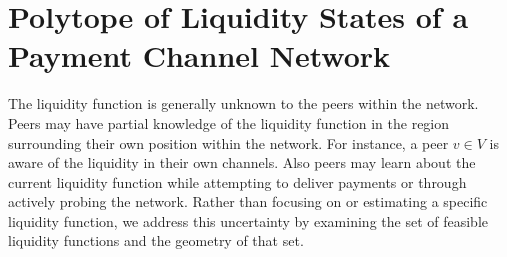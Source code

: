 \documentclass[10pt,twocolumn]{article}
\newtheorem{definition}{Definition}[section]
\newtheorem{lemma}[theorem]{Lemma}
\newcommand{\longhookrightarrow}{\lhook\joinrel\longrightarrow}
\begin{document}
\section{Polytope of Liquidity States of a Payment Channel Network}
\label{sec:statePolytope}

The liquidity function is generally unknown to the peers within the network.
Peers may have partial knowledge of the liquidity function in the region surrounding their own position within the network.
For instance, a peer \(v \in V\) is aware of the liquidity in their own channels.
Also peers may learn about the current liquidity function while attempting to deliver payments or through actively probing the network\cite{tikhomirov2020probing}.
Rather than focusing on or estimating a specific liquidity function, we address this uncertainty by examining the set of feasible liquidity functions and the geometry of that set.

\end{document}
